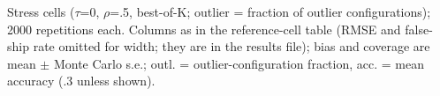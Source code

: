 Stress cells ($\tau$=0, $\rho$=.5, best-of-K; outlier = fraction of outlier configurations); 2000 repetitions each. Columns as in the reference-cell table (RMSE and false-ship rate omitted for width; they are in the results file); bias and coverage are mean $\pm$ Monte Carlo s.e.; outl. = outlier-configuration fraction, acc. = mean accuracy (.3 unless shown).
